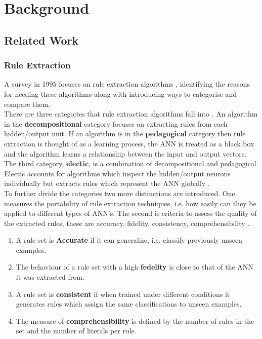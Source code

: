 \chapter{Background}\label{C:backgroundsurvey}
\section{Related Work}
\subsection{Rule Extraction}

A survey in 1995 focuses on rule extraction algorithms \cite{andrews1995survey}, identifying the reasons for needing these algorithms along with introducing ways to categorise and compare them.\\

There are three categories that rule extraction algorithms fall into \cite{andrews1995survey}. An algorithm in the \textbf{decompositional} category focuses on extracting rules from each hidden/output unit. If an algorithm is in the \textbf{pedagogical} category then rule extraction is thought of as a learning process, the ANN is treated as a black box and the algorithm learns a relationship between the input and output vectors. The third category, \textbf{electic}, is a combination of decompositional and pedagogical. Electic accounts for algorithms which inspect the hidden/output neurons individually but extracts rules which represent the ANN globally \cite{tickle1998truth}.\\

To further divide the categories two more distinctions are introduced. One measures the portability of rule extraction techniques, i.e. how easily can they be applied to different types of ANN's. The second is criteria to assess the quality of the extracted rules, these are accuracy, fidelity, consistency, comprehensibility \cite{andrews1995survey}.

\begin{enumerate}
\item A rule set is \textbf{Accurate} if it can generalize, i.e. classify previously unseen examples.
\item The behaviour of a rule set with a high \textbf{fedelity} is close to that of the ANN it was extracted from.
\item A rule set is \textbf{consistent} if when trained under different conditions it generates rules which assign the same classifications to unseen examples.
\item The measure of \textbf{comprehensibility} is defined by the number of rules in the set and the number of literals per rule.
\end{enumerate}

